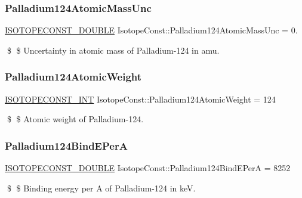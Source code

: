 \subsubsection{\texorpdfstring{Palladium124\+Atomic\+Mass\+Unc}{Palladium124AtomicMassUnc}}
{\footnotesize\ttfamily \mbox{\hyperlink{group___isotope_const-_macros_ga8f45a7272ce02c0b4c65c44636ed719a}{I\+S\+O\+T\+O\+P\+E\+C\+O\+N\+S\+T\+\_\+\+D\+O\+U\+B\+LE}} Isotope\+Const\+::\+Palladium124\+Atomic\+Mass\+Unc = 0.}

\$ \$ Uncertainty in atomic mass of Palladium-\/124 in amu. \mbox{\label{group___isotope_const-_palladium-_pd124_ga425ff12505418076b79d7ac0bdea3bd8}} 
\subsubsection{\texorpdfstring{Palladium124\+Atomic\+Weight}{Palladium124AtomicWeight}}
{\footnotesize\ttfamily \mbox{\hyperlink{group___isotope_const-_macros_ga5f18360b3e99483a35c32d789e62621c}{I\+S\+O\+T\+O\+P\+E\+C\+O\+N\+S\+T\+\_\+\+I\+NT}} Isotope\+Const\+::\+Palladium124\+Atomic\+Weight = 124}

\$ \$ Atomic weight of Palladium-\/124. \mbox{\label{group___isotope_const-_palladium-_pd124_gaaf07ab6cd545e36f4c98d1ba1f4cf777}} 
\subsubsection{\texorpdfstring{Palladium124\+Bind\+E\+PerA}{Palladium124BindEPerA}}
{\footnotesize\ttfamily \mbox{\hyperlink{group___isotope_const-_macros_ga8f45a7272ce02c0b4c65c44636ed719a}{I\+S\+O\+T\+O\+P\+E\+C\+O\+N\+S\+T\+\_\+\+D\+O\+U\+B\+LE}} Isotope\+Const\+::\+Palladium124\+Bind\+E\+PerA = 8252}

\$ \$ Binding energy per A of Palladium-\/124 in keV. \mbox{\label{group___isotope_const-_palladium-_pd124_gaea2d1a6183005a93955019d1cbb4c24d}} 
